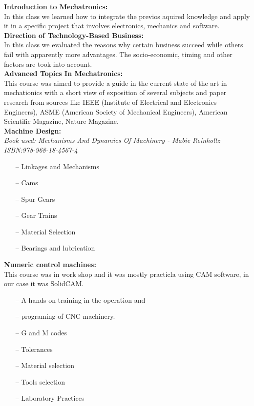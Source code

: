 \documentclass{article}
\begin{document}
\textbf{Introduction to Mechatronics:}\\
    In this class we learned how to integrate the
    previos aquired knowledge and apply it in a 
    specific project that involves electronics, 
    mechanics and software.\\
    \newline
\textbf{Direction of Technology-Based Business:}\\
    In this class we evaluated the reasons why certain business succeed while others fail
    with apparently more advantages. The socio-economic, timing and other factors are took into
    account.\\
    \newline
\textbf{Advanced Topics In Mechatronics:}\\
This course was aimed to provide a guide in the current state of the art in mechationics
with a short view of exposition of several subjects and paper research from sources like IEEE (Institute
of Electrical and Electronics Engineers), ASME (American Society of Mechanical Engineers), American 
Scientific Magazine, Nature Magazine.\\

\textbf{Machine Design:}\\
    \emph{Book used: Mechanisms And Dynamics Of Machinery - Mabie Reinholtz}\\
        \emph{ISBN:978-968-18-4567-4}
    \begin{itemize}
     \setlength\itemsep{0pt}
    \item[--] Linkages and Mechanisms
    \item[--] Cams
    \item[--] Spur Gears
    \item[--] Gear Trains
    \item[--] Material Selection
    \item[--] Bearings and lubrication
    \end{itemize}
 
    
\textbf{Numeric control machines:}\\
    This course was in work shop and it was mostly practicla using CAM software, in our case
    it was SolidCAM.
    \begin{itemize}
     \setlength\itemsep{0pt}
    \item[--] A hands-on training in the operation and
    \item[--] programing of CNC machinery.
    \item[--] G and M codes
    \item[--] Tolerances
    \item[--] Material selection
    \item[--] Tools selection
    \item[--] Laboratory Practices
    \end{itemize}
\end{document}
